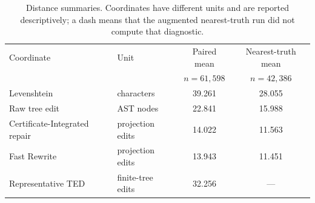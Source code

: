 \begin{table}[t]
\centering
\caption{Distance summaries. Coordinates have different units and are
reported descriptively; a dash means that the augmented nearest-truth run did
not compute that diagnostic.}
\label{tab:distance-summary}
\small
\setlength{\tabcolsep}{4pt}
\begin{tabular}{@{}llcc@{}}
\toprule
Coordinate & Unit & Paired mean & Nearest-truth mean\\
& & $n=61{,}598$ & $n=42{,}386$\\
\midrule
Levenshtein & characters & 39.261 & 28.055\\
Raw tree edit & AST nodes & 22.841 & 15.988\\
Certificate-Integrated repair & projection edits & 14.022 & 11.563\\
Fast Rewrite & projection edits & 13.943 & 11.451\\
Representative TED & finite-tree edits & 32.256 & ---\\
\bottomrule
\end{tabular}
\end{table}
